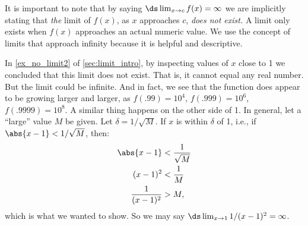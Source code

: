 It is important to note that by saying $\ds \lim_{x\to c}f(x) = \infty$ we are implicitly stating that \textit{the} limit of $f(x)$, as $x$ approaches $c$, \textit{does not exist.} A limit only exists when $f(x)$ approaches an actual numeric value. We use the concept of limits that approach infinity because it is helpful and descriptive.


{In \autoref{ex_no_limit2} of \autoref{sec:limit_intro}, by inspecting values of $x$ close to 1 we concluded that this limit does not exist.  That is, it cannot equal any real number.  But the limit could be infinite.  And in fact, we see that the function does appear to be growing larger and larger, as $f(.99)=10^4$, $f(.999)=10^6$, $f(.9999)=10^8$.  A similar thing happens on the other side of 1.  In general, let a ``large'' value $M$ be given. Let $\delta=1/\sqrt{M}$. If $x$ is within $\delta$ of 1, i.e., if $\abs{x-1}<1/\sqrt{M}$, then:
	\begin{align*}
	\abs{x-1} &< \frac{1}{\sqrt{M}} \\
	(x-1)^2 &< \frac{1}{M}\\
	\frac{1}{(x-1)^2} &> M,
	\end{align*}
	which is what we wanted to show.  So we may say $\ds\lim_{x\rightarrow 1}1/{(x-1)^2}=\infty$.}

